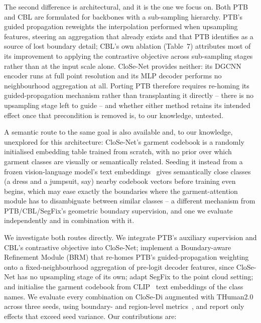 \documentclass{article}
\theoremstyle{plain}
\theoremstyle{definition}
\theoremstyle{remark}
\begin{document}
The second difference is architectural, and it is the one we focus on. Both
PTB and CBL are formulated for backbones with a sub-sampling hierarchy. PTB's
guided propagation reweights the interpolation performed when upsampling
features, steering an aggregation that already exists and that PTB identifies
as a source of lost boundary detail; CBL's own ablation (Table~7) attributes
most of its improvement to applying the contrastive objective across
sub-sampling stages rather than at the input scale alone. CloSe-Net provides neither: its DGCNN
encoder runs at full point resolution and its MLP decoder performs no
neighbourhood aggregation at all. Porting PTB therefore requires re-homing its
guided-propagation mechanism rather than transplanting it directly -- there is
no upsampling stage left to guide -- and whether either method retains its
intended effect once that precondition is removed is, to our knowledge,
untested.

A semantic route to the same goal is also available and, to our knowledge,
unexplored for this architecture: CloSe-Net's garment codebook is a randomly
initialised embedding table trained from scratch, with no prior over which
garment classes are visually or semantically related. Seeding it instead from
a frozen vision-language model's text embeddings~\cite{radford2021clip} gives
semantically close classes (a dress and a jumpsuit, say) nearby codebook
vectors before training even begins, which may ease exactly the boundaries
where the garment-attention module has to disambiguate between similar
classes -- a different mechanism from PTB/CBL/SegFix's geometric boundary
supervision, and one we evaluate independently and in combination with it.

We investigate both routes directly. We integrate PTB's auxiliary supervision
and CBL's contrastive objective into CloSe-Net; implement a Boundary-aware
Refinement Module (BRM) that re-homes PTB's guided-propagation weighting onto
a fixed-neighbourhood aggregation of pre-logit decoder features, since
CloSe-Net has no upsampling stage of its own; adapt SegFix to the point cloud
setting; and initialise the garment codebook from CLIP~\cite{radford2021clip}
text embeddings of the class names. We evaluate every combination on CloSe-Di
augmented with THuman2.0 across three seeds, using boundary- and region-level
metrics~\cite{tang2022contrastive,biou}, and report only effects that exceed
seed variance. Our contributions are:
\end{document}
